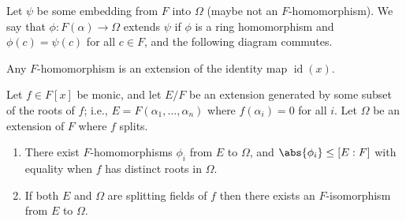\begin{theorem}
Let $\psi$ be some embedding from $F$ into $\Omega$ (maybe not an $F$-homomorphism). We say that $\phi\colon F(\alpha) \to \Omega$ extends $\psi$ if $\phi$ is a ring homomorphism and $\phi(c) = \psi(c)$ for all $c \in F$, and the following diagram commutes.
\begin{center}
\end{center}
\end{theorem}

\begin{corollary}
Any $F$-homomorphism is an extension of the identity map $\operatorname{id}(x)$.
\end{corollary}

\begin{proposition}
Let $f \in F[x]$ be monic, and let $E/F$ be an extension generated by some subset of the roots of $f$; i.e., $E = F(\alpha_1, \dotsc, \alpha_n)$ where $f(\alpha_i) = 0$ for all $i$. Let $\Omega$ be an extension of $F$ where $f$ splits.
\begin{enumerate}[label={\textup{(\alph*)}}]
\item There exist $F$-homomorphisms $\phi_i$ from $E$ to $\Omega$, and $\abs{\phi_i} \leq [E : F]$ with equality when $f$ has distinct roots in $\Omega$.
\item If both $E$ and $\Omega$ are splitting fields of $f$ then there exists an $F$-isomorphism from $E$ to $\Omega$.
\end{enumerate}
\end{proposition}

